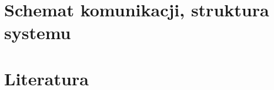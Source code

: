 \documentclass[a4paper, 11pt]{article}
\begin{document}
\section{Schemat komunikacji, struktura systemu}
\section{Literatura}
\end{document}
